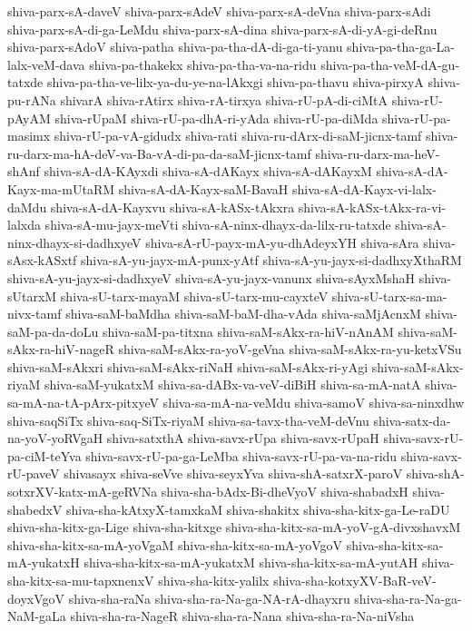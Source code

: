{shiva-parx-sA-daveV
shiva-parx-sAdeV
shiva-parx-sA-deVna
shiva-parx-sAdi
shiva-parx-sA-di-ga-LeMdu
shiva-parx-sA-dina
shiva-parx-sA-di-yA-gi-deRnu
shiva-parx-sAdoV
shiva-patha
shiva-pa-tha-dA-di-ga-ti-yanu
shiva-pa-tha-ga-La-lalx-veM-dava
shiva-pa-thakekx
shiva-pa-tha-va-na-ridu
shiva-pa-tha-veM-dA-gu-tatxde
shiva-pa-tha-ve-lilx-ya-du-ye-na-lAkxgi
shiva-pa-thavu
shiva-pirxyA
shiva-pu-rANa
shivarA
shiva-rAtirx
shiva-rA-tirxya
shiva-rU-pA-di-ciMtA
shiva-rU-pAyAM
shiva-rUpaM
shiva-rU-pa-dhA-ri-yAda
shiva-rU-pa-diMda
shiva-rU-pa-masimx
shiva-rU-pa-vA-gidudx
shiva-rati
shiva-ru-dArx-di-saM-jicnx-tamf
shiva-ru-darx-ma-hA-deV-va-Ba-vA-di-pa-da-saM-jicnx-tamf
shiva-ru-darx-ma-heV-shAnf
shiva-sA-dA-KAyxdi
shiva-sA-dAKayx
shiva-sA-dAKayxM
shiva-sA-dA-Kayx-ma-mUtaRM
shiva-sA-dA-Kayx-saM-BavaH
shiva-sA-dA-Kayx-vi-lalx-daMdu
shiva-sA-dA-Kayxvu
shiva-sA-kASx-tAkxra
shiva-sA-kASx-tAkx-ra-vi-lalxda
shiva-sA-mu-jayx-meVti
shiva-sA-ninx-dhayx-da-lilx-ru-tatxde
shiva-sA-ninx-dhayx-si-dadhxyeV
shiva-sA-rU-payx-mA-yu-dhAdeyxYH
shiva-sAra
shiva-sAsx-kASxtf
shiva-sA-yu-jayx-mA-punx-yAtf
shiva-sA-yu-jayx-si-dadhxyXthaRM
shiva-sA-yu-jayx-si-dadhxyeV
shiva-sA-yu-jayx-vanunx
shiva-sAyxMshaH
shiva-sUtarxM
shiva-sU-tarx-mayaM
shiva-sU-tarx-mu-cayxteV
shiva-sU-tarx-sa-ma-nivx-tamf
shiva-saM-baMdha
shiva-saM-baM-dha-vAda
shiva-saMjAcnxM
shiva-saM-pa-da-doLu
shiva-saM-pa-titxna
shiva-saM-sAkx-ra-hiV-nAnAM
shiva-saM-sAkx-ra-hiV-nageR
shiva-saM-sAkx-ra-yoV-geVna
shiva-saM-sAkx-ra-yu-ketxVSu
shiva-saM-sAkxri
shiva-saM-sAkx-riNaH
shiva-saM-sAkx-ri-yAgi
shiva-saM-sAkx-riyaM
shiva-saM-yukatxM
shiva-sa-dABx-va-veV-diBiH
shiva-sa-mA-natA
shiva-sa-mA-na-tA-pArx-pitxyeV
shiva-sa-mA-na-veMdu
shiva-samoV
shiva-sa-ninxdhw
shiva-saqSiTx
shiva-saq-SiTx-riyaM
shiva-sa-tavx-tha-veM-deVnu
shiva-satx-da-na-yoV-yoRVgaH
shiva-satxthA
shiva-savx-rUpa
shiva-savx-rUpaH
shiva-savx-rU-pa-ciM-teYva
shiva-savx-rU-pa-ga-LeMba
shiva-savx-rU-pa-va-na-ridu
shiva-savx-rU-paveV
shivasayx
shiva-seVve
shiva-seyxYva
shiva-shA-satxrX-paroV
shiva-shA-sotxrXV-katx-mA-geRVNa
shiva-sha-bAdx-Bi-dheVyoV
shiva-shabadxH
shiva-shabedxV
shiva-sha-kAtxyX-tamxkaM
shiva-shakitx
shiva-sha-kitx-ga-Le-raDU
shiva-sha-kitx-ga-Lige
shiva-sha-kitxge
shiva-sha-kitx-sa-mA-yoV-gA-divxshavxM
shiva-sha-kitx-sa-mA-yoVgaM
shiva-sha-kitx-sa-mA-yoVgoV
shiva-sha-kitx-sa-mA-yukatxH
shiva-sha-kitx-sa-mA-yukatxM
shiva-sha-kitx-sa-mA-yutAH
shiva-sha-kitx-sa-mu-tapxnenxV
shiva-sha-kitx-yalilx
shiva-sha-kotxyXV-BaR-veV-doyxVgoV
shiva-sha-raNa
shiva-sha-ra-Na-ga-NA-rA-dhayxru
shiva-sha-ra-Na-ga-NaM-gaLa
shiva-sha-ra-NageR
shiva-sha-ra-Nana
shiva-sha-ra-Na-niVsha
}
